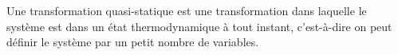 ﻿\documentclass[a4paper]{article}
\begin{document}
\pagestyle{fancy}
\fancyhf{}
\setlength{\headheight}{15pt}

\begin{center}
	\large{}
\end{center}


Une transformation quasi-statique est une transformation dans laquelle le système est dans un état thermodynamique à tout instant, c'est-à-dire on peut définir le système par un petit nombre de variables.
\end{document}
